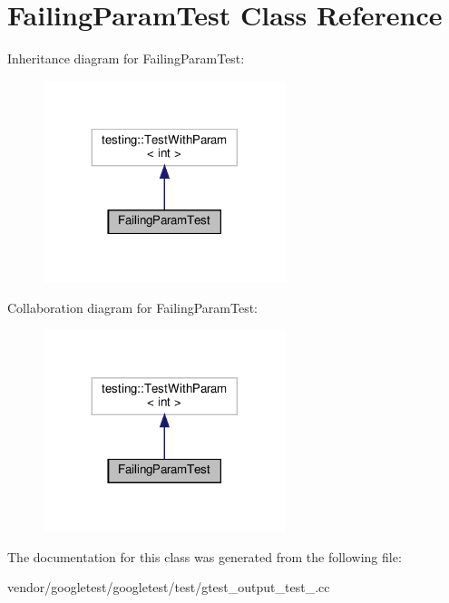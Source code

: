 \hypertarget{class_failing_param_test}{}\section{Failing\+Param\+Test Class Reference}
\label{class_failing_param_test}


Inheritance diagram for Failing\+Param\+Test\+:
\nopagebreak
\begin{figure}[H]
\begin{center}
\leavevmode
\includegraphics[width=200pt]{class_failing_param_test__inherit__graph}
\end{center}
\end{figure}


Collaboration diagram for Failing\+Param\+Test\+:
\nopagebreak
\begin{figure}[H]
\begin{center}
\leavevmode
\includegraphics[width=200pt]{class_failing_param_test__coll__graph}
\end{center}
\end{figure}


The documentation for this class was generated from the following file\+:\begin{DoxyCompactItemize}
\item 
vendor/googletest/googletest/test/gtest\+\_\+output\+\_\+test\+\_\+.\+cc\end{DoxyCompactItemize}
